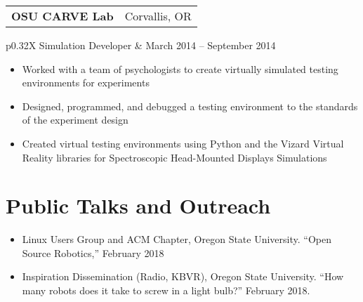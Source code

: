 \documentclass[letterpaper,10pt,titlepage]{article}
\newcommand{\leftW}{0.32\textwidth}
\begin{document}
\begin{tabularx}{\linewidth}{Xr}
	\textbf{OSU CARVE Lab} & Corvallis, OR\\
\end{tabularx}
\begin{tabularx}{\linewidth}{p{\leftW}X}
	Simulation Developer   & March 2014 -- September 2014\\
\end{tabularx}
\begin{itemize} \itemsep1pt \parskip0pt 
\item Worked with a team of psychologists to create virtually simulated testing environments for experiments
\item Designed, programmed, and debugged a testing environment to the standards of the experiment design
\item Created virtual testing environments using Python and the Vizard Virtual Reality libraries for Spectroscopic Head-Mounted Displays Simulations
\end{itemize}

\begin{comment} %
\begin{tabularx}{\linewidth}{Xr}
\textbf{\textit{Crossroads Carnegie Art Center}} & \textbf{Volunteer}\\
\textbf{Technical Support, Web Master}           & June 2013 -- August 2013\\
Baker City, Oregon & \\
\end{tabularx}

\begin{itemize} \itemsep1pt \parskip0pt \parsep0pt
\item Created digital backups of previous years tax information
\item Transferred customer data to a new cloud database for the Center
\item Maintained custom PHP/XHTML website to specifications
\item Provided consultation on creation of requirements for a new website
\end{itemize}
\end{comment}

\section*{Public Talks and Outreach}
\begin{itemize}
	\item Linux Users Group and ACM Chapter, Oregon State University. ``Open Source Robotics,'' February 2018
	\item Inspiration Dissemination (Radio, KBVR), Oregon State University. ``How many robots does it take to screw in a light bulb?'' February 2018. 
\end{itemize}
\end{document}
